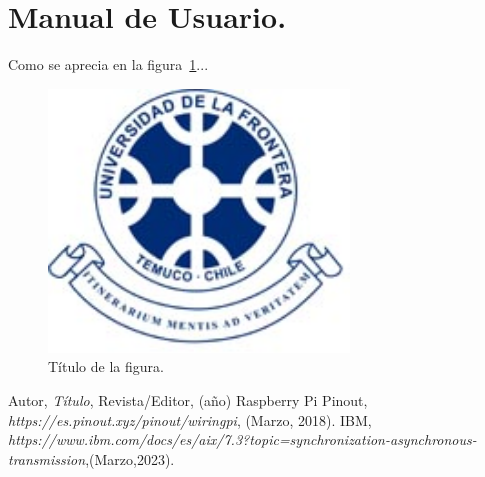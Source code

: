 \documentclass[12pt,letterpaper]{article}
\begin{document}
\section{Manual de Usuario.}
Como se aprecia en la figura~\ref{fig:logo}...

\begin{figure}[H]
\centering
\includegraphics[width=8cm]{./img/logo.png}
\caption{Título de la figura.}
\label{fig:logo}
\end{figure}

\begin{thebibliography}{99}

 Autor, \emph{Título}, Revista/Editor, (año)
 Raspberry Pi Pinout, \emph{https://es.pinout.xyz/pinout/wiringpi}, (Marzo, 2018).
 IBM, \emph{https://www.ibm.com/docs/es/aix/7.3?topic=synchronization-asynchronous-transmission},(Marzo,2023).

\end{thebibliography}
\end{document}
